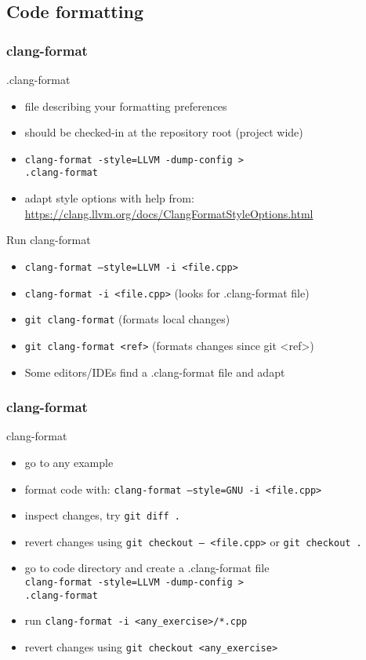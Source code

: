 \subsection[format]{Code formatting}

\begin{frame}[fragile]
\frametitle{clang-format}
\begin{block}{.clang-format}
	\begin{itemize}
		\item file describing your formatting preferences
		\item should be checked-in at the repository root (project wide)
		\item \texttt{clang-format -style=LLVM -dump-config >} \\
		  \texttt{.clang-format}
		\item adapt style options with help from: \url{https://clang.llvm.org/docs/ClangFormatStyleOptions.html}
	\end{itemize}
\end{block}
\begin{block}{Run clang-format}
	\begin{itemize}
		\item \texttt{clang-format --style=LLVM -i <file.cpp>}
		\item \texttt{clang-format -i <file.cpp>} (looks for .clang-format file)
		\item \texttt{git clang-format} (formats local changes)
		\item \texttt{git clang-format <ref>} (formats changes since git \textless{}ref\textgreater{})
		\item Some editors/IDEs find a .clang-format file and adapt
	\end{itemize}
\end{block}
\end{frame}

\begin{frame}[fragile]
\frametitle{clang-format}
\begin{exercise}{clang-format}
	\begin{itemize}
		\item go to any example
		\item format code with: \texttt{clang-format --style=GNU -i <file.cpp>}
		\item inspect changes, try \texttt{git diff .}
		\item revert changes using \texttt{git checkout -- <file.cpp>} or \texttt{git checkout .}
		\item go to code directory and create a .clang-format file \\
		  \texttt{clang-format -style=LLVM -dump-config >} \\
		  \texttt{.clang-format}
		\item run \texttt{clang-format -i <any_exercise>/*.cpp}
		\item revert changes using \texttt{git checkout <any_exercise>}
	\end{itemize}
\end{exercise}
\end{frame}
